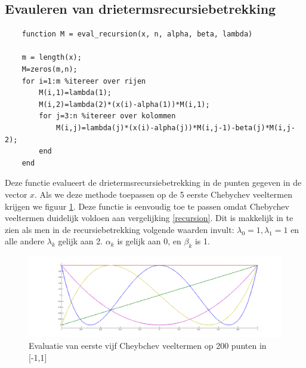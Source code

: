 \documentclass[a4paper, 12pt, titlepage]{report}
\begin{document}
\subsection{Evauleren van drietermsrecursiebetrekking}
\begin{lstlisting}
	function M = eval_recursion(x, n, alpha, beta, lambda)
	
	m = length(x);
	M=zeros(m,n);
	for i=1:m %itereer over rijen
	    M(i,1)=lambda(1);
	    M(i,2)=lambda(2)*(x(i)-alpha(1))*M(i,1);
	    for j=3:n %itereer over kolommen
	        M(i,j)=lambda(j)*(x(i)-alpha(j))*M(i,j-1)-beta(j)*M(i,j-2);
	    end
	end
\end{lstlisting}
Deze functie evalueert de drietermsrecursiebetrekking in de punten gegeven in de vector $x$. Als we deze methode toepassen op de 5 eerste Chebychev veeltermen krijgen we figuur \ref{chebychev}. Deze functie is eenvoudig toe te passen omdat Chebychev veeltermen duidelijk voldoen aan vergelijking \eqref{recursion}. Dit is makkelijk in te zien als men in de recursiebetrekking volgende waarden invult: $\lambda_0=1, \lambda_1=1$ en alle andere $\lambda_k$ gelijk aan 2. $\alpha_k$ is gelijk aan 0, en $\beta_k$ is 1. \\

\begin{figure}[htb]
	\centering
	\includegraphics[width=\textwidth]{chebychev.png}
	\caption{Evaluatie van eerste vijf Cheybchev veeltermen op 200 punten in [-1,1]}
	\label{chebychev}
\end{figure}
\end{document}
